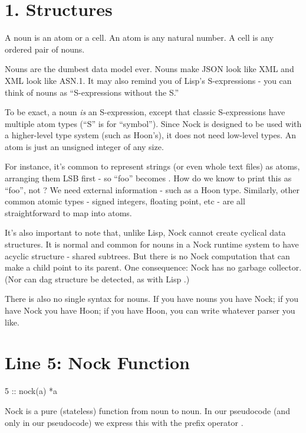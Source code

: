 \section{1. Structures}

\begin{code}
A noun is an atom or a cell.  An atom is any natural number.
A cell is any ordered pair of nouns.
\end{code}
Nouns are the dumbest data model ever.  Nouns make JSON look like XML and XML
look like ASN.1.  It may also remind you of Lisp's S-expressions - you can
think of nouns as ``S-expressions without the S.''

To be exact, a noun \emph{is} an S-expression, except that classic S-expressions
have multiple atom types (``S'' is for ``symbol'').  Since Nock is designed to be
used with a higher-level type system (such as Hoon's), it does not need
low-level types.  An atom is just an unsigned integer of any size.

For instance, it's common to represent strings (or even whole text files) as
atoms, arranging them LSB first - so ``foo'' becomes .  How do we know
to print this as ``foo'', not ?  We need external information - such as
a Hoon type.  Similarly, other common atomic types - signed integers, floating
point, etc
- are all straightforward to map into atoms.

It's also important to note that, unlike Lisp, Nock cannot create cyclical data
structures.  It is normal and common for nouns in a Nock runtime system to have
acyclic structure - shared subtrees.  But there is no Nock computation that can
make a child point to its parent.  One consequence: Nock has no garbage
collector.  (Nor can dag structure be detected, as with Lisp .)

There is also no single syntax for nouns.  If you have nouns you have Nock; if
you have Nock you have Hoon; if you have Hoon, you can write whatever parser
you like.

\section{Line 5: Nock Function}

\begin{code}
5  ::    nock(a)           *a
\end{code}
Nock is a pure (stateless) function from noun to noun.  In our pseudocode (and
only in our pseudocode) we express this with the prefix operator \kode{*}.

